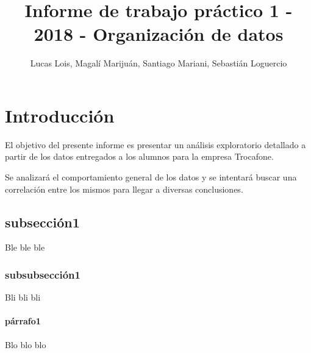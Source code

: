 \documentclass{article}
\title{Informe de trabajo práctico 1 - 2018 - Organización de datos}
\author{Lucas Lois, Magalí Marijuán, Santiago Mariani, Sebastián Loguercio}
\begin{document}

\maketitle

\tableofcontents %
\cleardoublepage


\section{Introducción}
El objetivo del presente informe es presentar un análisis exploratorio detallado a partir de los datos entregados a los alumnos para la empresa Trocafone.

Se analizará el comportamiento general de los datos y se intentará buscar una correlación entre los mismos para llegar a diversas conclusiones.
\subsection{subsección1}
Ble ble ble
\subsubsection{subsubsección1}
Bli bli bli
\paragraph{párrafo1}
Blo blo blo
\end{document}
